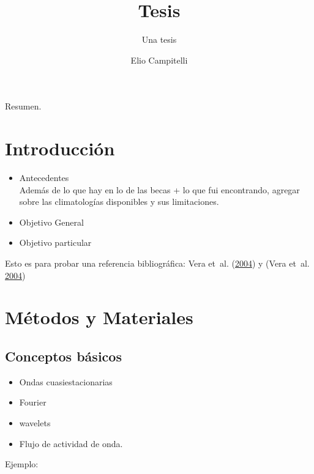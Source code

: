 \documentclass[spanish,a4paper]{book}
\title{Tesis}
\subtitle{Una tesis}
\author{Elio Campitelli}
\date{}
\providecommand{\tightlist}{%
  \setlength{\itemsep}{0pt}\setlength{\parskip}{0pt}}
\begin{document}
\maketitle

{
\setcounter{tocdepth}{3}
\tableofcontents
}
Resumen.


\chapter{Introducción}\label{introduccion}

\begin{itemize}
\tightlist
\item
  Antecedentes\\
  Además de lo que hay en lo de las becas + lo que fui encontrando,
  agregar sobre las climatologías disponibles y sus limitaciones.
\item
  Objetivo General
\item
  Objetivo particular
\end{itemize}

Esto es para probar una referencia bibliográfica: Vera et~al.
(\protect\hyperlink{ref-Vera2004}{2004}) y (Vera et~al.
\protect\hyperlink{ref-Vera2004}{2004})

\chapter{Métodos y Materiales}\label{metodos-y-materiales}


\section{Conceptos básicos}\label{conceptos-basicos}

\begin{itemize}
\tightlist
\item
  Ondas cuasiestacionarias
\item
  Fourier
\item
  wavelets
\item
  Flujo de actividad de onda.
\end{itemize}


Ejemplo:
\end{document}
